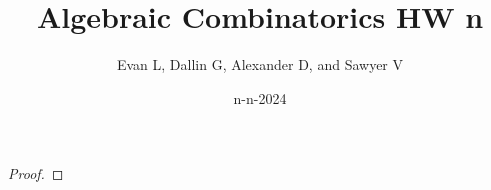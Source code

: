 \documentclass[11pt]{scrartcl}
\title{Algebraic Combinatorics HW n}
\author{Evan L, Dallin G, Alexander D, and Sawyer V}
\date{n-n-2024}
\begin{document}
\maketitle
\setcounter{section}{1}
\begin{problem}[\textcolor{red}{}]
\end{problem}
\begin{proof}
\end{proof}
\end{document}
